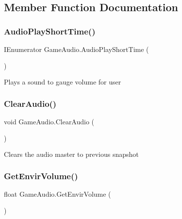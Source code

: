 \subsection{Member Function Documentation}
\mbox{\label{class_game_audio_ad0c6d18af4a44a21b3068aa33296fa3e}} 
\subsubsection{\texorpdfstring{Audio\+Play\+Short\+Time()}{AudioPlayShortTime()}}
{\footnotesize\ttfamily I\+Enumerator Game\+Audio.\+Audio\+Play\+Short\+Time (\begin{DoxyParamCaption}{ }\end{DoxyParamCaption})\hspace{0.3cm}{\ttfamily [private]}}



Plays a sound to gauge volume for user 

\mbox{\label{class_game_audio_a4dcefb7ae958cf0acd5ab0901eb35532}} 
\subsubsection{\texorpdfstring{Clear\+Audio()}{ClearAudio()}}
{\footnotesize\ttfamily void Game\+Audio.\+Clear\+Audio (\begin{DoxyParamCaption}{ }\end{DoxyParamCaption})}



Clears the audio master to previous snapshot 

\mbox{\label{class_game_audio_a248a7e8b9bdecb3b3fc24e5654a40f8c}} 
\subsubsection{\texorpdfstring{Get\+Envir\+Volume()}{GetEnvirVolume()}}
{\footnotesize\ttfamily float Game\+Audio.\+Get\+Envir\+Volume (\begin{DoxyParamCaption}{ }\end{DoxyParamCaption})}



